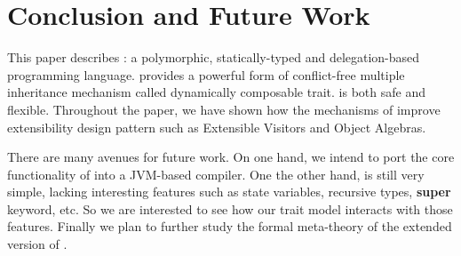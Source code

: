 \section{Conclusion and Future Work}

This paper describes \name: a polymorphic, statically-typed and delegation-based
programming language. \name provides a powerful form of conflict-free multiple
inheritance mechanism called dynamically composable trait. \name is both safe
and flexible. Throughout the paper, we have shown how the mechanisms of \name
improve extensibility design pattern such as Extensible Visitors and Object
Algebras.

There are many avenues for future work. On one hand, we intend to port the core
functionality of \name into a JVM-based compiler. One the other hand, \name is
still very simple, lacking interesting features such as state variables,
recursive types, \textbf{super} keyword, etc. So we are interested to see how
our trait model interacts with those features. Finally we plan to further study
the formal meta-theory of the extended version of \bname.
